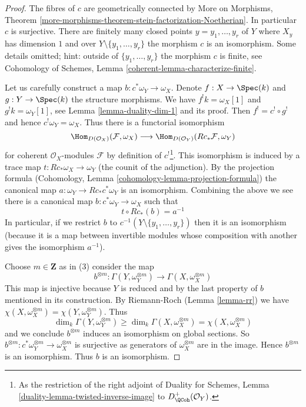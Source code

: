 \begin{proof}
The fibres of $c$ are geometrically connected by
More on Morphisms, Theorem
\ref{more-morphisms-theorem-stein-factorization-Noetherian}.
In particular $c$ is surjective.
There are finitely many closed points $y = y_1, \ldots, y_r$ of $Y$ where
$X_y$ has dimension $1$ and over $Y \setminus \{y_1, \ldots, y_r\}$
the morphism $c$ is an isomorphism.
Some details omitted; hint: outside of $\{y_1, \ldots, y_r\}$
the morphism $c$ is finite, see
Cohomology of Schemes, Lemma \ref{coherent-lemma-characterize-finite}.

\medskip\noindent
Let us carefully construct a map $b : c^*\omega_Y \to \omega_X$.
Denote $f : X \to \Spec(k)$ and $g : Y \to \Spec(k)$ the structure
morphisms. We have $f^!k = \omega_X[1]$ and $g^!k = \omega_Y[1]$, see
Lemma \ref{lemma-duality-dim-1} and its proof. Then
$f^! = c^! \circ g^!$ and hence $c^!\omega_Y = \omega_X$.
Thus there is a functorial isomorphism
$$
\Hom_{D(\mathcal{O}_X)}(\mathcal{F}, \omega_X)
\longrightarrow
\Hom_{D(\mathcal{O}_Y)}(Rc_*\mathcal{F}, \omega_Y)
$$
for coherent $\mathcal{O}_X$-modules $\mathcal{F}$ by definition
of $c^!$\footnote{As the restriction of the right adjoint of
Duality for Schemes, Lemma \ref{duality-lemma-twisted-inverse-image} to
$D^+_\QCoh(\mathcal{O}_Y)$.}.
This isomorphism is induced by a trace map $t : Rc_*\omega_X \to \omega_Y$
(the counit of the adjunction). By the projection formula
(Cohomology, Lemma \ref{cohomology-lemma-projection-formula})
the canonical map $a : \omega_Y \to Rc_*c^*\omega_Y$ is an isomorphism.
Combining the above we see there is a canonical map
$b : c^*\omega_Y \to \omega_X$ such that
$$
t \circ Rc_*(b) = a^{-1}
$$
In particular, if we restrict $b$ to $c^{-1}(Y \setminus \{y_1, \ldots, y_r\})$
then it is an isomorphism (because it is a map between invertible modules
whose composition with another gives the isomorphism $a^{-1}$).

\medskip\noindent
Choose $m \in \mathbf{Z}$ as in (3) consider the map
$$
b^{\otimes m} :
\Gamma(Y, \omega_Y^{\otimes m})
\longrightarrow
\Gamma(X, \omega_X^{\otimes m})
$$
This map is injective because $Y$ is reduced and by the last
property of $b$ mentioned in its construction.
By Riemann-Roch (Lemma \ref{lemma-rr}) we have
$\chi(X, \omega_X^{\otimes m}) =\chi(Y, \omega_Y^{\otimes m})$.
Thus
$$
\dim_k \Gamma(Y, \omega_Y^{\otimes m}) \geq
\dim_k \Gamma(X, \omega_X^{\otimes m}) = \chi(X, \omega_X^{\otimes m})
$$
and we conclude $b^{\otimes m}$ induces an isomorphism on global
sections. So
$b^{\otimes m} : c^*\omega_Y^{\otimes m} \to \omega_X^{\otimes m}$
is surjective as generators of $\omega_X^{\otimes m}$ are in the image.
Hence $b^{\otimes m}$ is an isomorphism. Thus $b$ is an isomorphism.
\end{proof}

